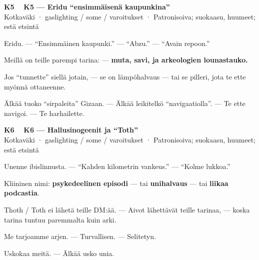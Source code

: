 \documentclass[a4paper,11pt]{article}
\begin{document}
\filbreak
\vspace{0.9mm}
\noindent
\begin{tcolorbox}[
  colframe=eaglecol,
  colback=white,
  boxrule=0.8pt,
  arc=0pt,
  outer arc=0pt,
  left=2.5mm, right=2.5mm, top=2mm, bottom=2mm,
  boxsep=0.5mm,
  sharp corners,
  enhanced,
  breakable=false
]
{\large\ttfamily\bfseries K5}~~
{\normalsize\bfseries K5 --- Eridu ``ensimmäisenä kaupunkina''}\\[0.2em]
{\small\color{black!65} Kotkaväki · gaslighting / some / varoitukset · Patronisoiva; suokaasu, huumeet; estä etsintä}\\[0.35em]
{\normalsize\raggedright Eridu. --- ``Ensimmäinen kaupunki.'' --- ``Abzu.'' --- ``Avain repoon.''

Meillä on teille parempi tarina: --- \textbf{muta, savi, ja arkeologien lounastauko.}

Jos ``tunnette'' siellä jotain, --- se on lämpöhalvaus --- tai se pilleri, jota te ette myönnä ottaneenne.

Älkää tuoko ``sirpaleita'' Gizaan. --- Älkää leikitelkö ``navigaatiolla''. --- Te ette navigoi. --- Te harhailette.}
\end{tcolorbox}

\filbreak
\vspace{0.9mm}
\noindent
\begin{tcolorbox}[
  colframe=eaglecol,
  colback=white,
  boxrule=0.8pt,
  arc=0pt,
  outer arc=0pt,
  left=2.5mm, right=2.5mm, top=2mm, bottom=2mm,
  boxsep=0.5mm,
  sharp corners,
  enhanced,
  breakable=false
]
{\large\ttfamily\bfseries K6}~~
{\normalsize\bfseries K6 --- Hallusinogeenit ja ``Toth''}\\[0.2em]
{\small\color{black!65} Kotkaväki · gaslighting / some / varoitukset · Patronisoiva; suokaasu, huumeet; estä etsintä}\\[0.35em]
{\normalsize\raggedright Unenne ibislinnusta. --- ``Kahden kilometrin vankeus.'' --- ``Kolme lukkoa.''

Kliininen nimi: \textbf{psykedeelinen episodi} --- tai \textbf{unihalvaus} --- tai \textbf{liikaa podcastia}.

Thoth / Toth ei lähetä teille DM:ää. --- Aivot lähettävät teille tarinaa, --- koska tarina tuntuu paremmalta kuin arki.

Me tarjoamme arjen. --- Turvallisen. --- Selitetyn.

Uskokaa meitä. --- Älkää usko unia.}
\end{tcolorbox}
\end{document}
